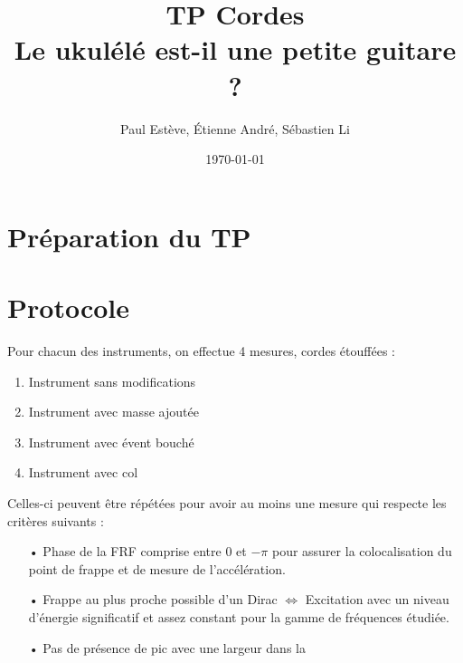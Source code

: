 \documentclass[atiam, article]{rapport} %
\title{TP Cordes\\Le ukulélé est-il une petite guitare ?}
\author{Paul Estève, Étienne André, Sébastien Li} %
\date{\today}
\begin{document}
\maketitle

\section{Préparation du TP}

\section{Protocole}

Pour chacun des instruments, on effectue 4 mesures, cordes étouffées :
\begin{enumerate}
    \item Instrument sans modifications
    \item Instrument avec masse ajoutée
    \item Instrument avec évent bouché
    \item Instrument avec col
\end{enumerate}

Celles-ci peuvent être répétées pour avoir au moins une mesure qui respecte les critères suivants :

\begin{itemize}
    \item[•] Phase de la FRF comprise entre $0$ et $-\pi$ pour assurer la colocalisation du point de frappe et de mesure de l'accélération.
    \item[•] Frappe au plus proche possible d'un Dirac $\Leftrightarrow$ Excitation avec un niveau d'énergie significatif et assez constant pour la gamme de fréquences étudiée.
    \item[•] Pas de présence de pic avec une largeur dans la 
\end{itemize}

\printbibliography
\end{document}
